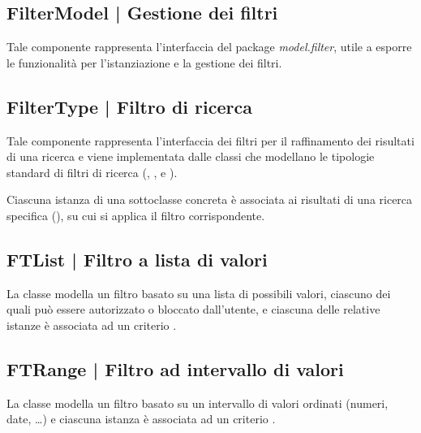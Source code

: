 \documentclass[10pt,a4paper,headinclude,footinclude,hidelinks]{scrreprt} %
\begin{document}
	\subsection[FilterModel]{FilterModel | Gestione dei filtri}
	\label{sec:stage:design:sistema:model.filter:filter-manager}
	Tale componente rappresenta l'interfaccia del package \textit{model.filter}, utile a esporre le funzionalità per l'istanziazione e la gestione dei filtri.

	\subsection[FilterType]{FilterType | Filtro di ricerca}
	\label{sec:stage:design:sistema:model.filter:filter}
	Tale componente rappresenta l'interfaccia dei filtri per il raffinamento dei risultati di una ricerca e viene implementata dalle classi che modellano le tipologie standard di filtri di ricerca (\textit{}, \textit{}, \textit{} e \textit{}).
	
	Ciascuna istanza di una sottoclasse concreta è associata ai risultati di una ricerca specifica (\textit{}), su cui si applica il filtro corrispondente.

	\subsection[FTList]{FTList | Filtro a lista di valori}
	\label{sec:stage:design:sistema:model.filter:list-filter}
	La classe \textit{} modella un filtro basato su una lista di possibili valori, ciascuno dei quali può essere autorizzato o bloccato dall'utente, e ciascuna delle relative istanze è associata ad un criterio \textit{}.

	\subsection[FTRange]{FTRange | Filtro ad intervallo di valori}
	\label{sec:stage:design:sistema:model.filter:range-filter}
	La classe \textit{} modella un filtro basato su un intervallo di valori ordinati (numeri, date, \ldots) e ciascuna istanza è associata ad un criterio \textit{}.
\end{document}

